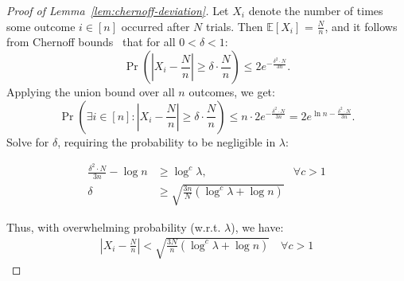 \begin{proof}[Proof of Lemma~\ref{lem:chernoff-deviation}]

Let $X_i$ denote the number of times some outcome $i \in [n]$ occurred after $N$ trials. Then $\mathbb{E}[X_i]$ = $\frac{N}{n}$, and it follows from Chernoff bounds~\cite[Cor.~4.6]{MU05} that for all $0 < \delta < 1$:
$$
\Pr\left(|X_i - \frac{N}{n}| \geq \delta \cdot \frac{N}{n} \right) \leq 2 e^{-\frac{\delta^2 \cdot N}{3n}}.
$$
Applying the union bound over all $n$ outcomes, we get:
$$
\Pr\left(\exists i \in [n]: |X_i - \frac{N}{n}| \geq \delta \cdot \frac{N}{n} \right) \leq n \cdot 2 e^{-\frac{\delta^2 \cdot N}{3n}} = 2 e^{\ln n -\frac{\delta^2 \cdot N}{3n}}.
$$
Solve for $\delta$, requiring the probability to be negligible in $\lambda$:

\begin{align*}
\frac{\delta^2 \cdot N}{3n} - \log n &\geq \log^c \lambda, &\forall c > 1\\
\delta &\geq \sqrt{\frac{3n}{N}(\log^c \lambda + \log n)} &
\end{align*}

Thus, with overwhelming probability (w.r.t. $\lambda$), we have:
\begin{align*}
    \left|X_i - \frac{N}{n}\right| < \sqrt{\frac{3N}{n}(\log^c \lambda + \log n)} \quad \forall c > 1
\end{align*}

\end{proof}


